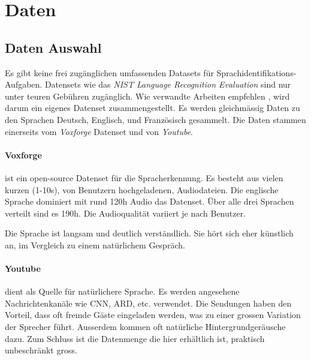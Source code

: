 \section{Daten}


\subsection{Daten Auswahl}
Es gibt keine frei zugänglichen umfassenden Datasets für Sprachidentifikations-Aufgaben. Datensets wie das \textit{NIST Language Recognition Evaluation}\cite{nist} sind nur unter teuren Gebühren zugänglich. Wie verwandte Arbeiten empfehlen \cite{iLID}, wird darum ein eigenes Datenset zusammengestellt. Es werden gleichmässig Daten zu den Sprachen Deutsch, Englisch, und Französisch gesammelt. Die Daten stammen einerseits vom \textit{Voxforge}\cite{voxforge} Datenset und von \textit{Youtube}\cite{youtube}.

\paragraph{Voxforge} ist ein open-source Datenset für die Spracherkennung. Es besteht aus vielen kurzen (1-10s), von Benutzern hochgeladenen, Audiodateien. Die englische Sprache dominiert mit rund 120h Audio das Datenset. Über alle drei Sprachen verteilt sind es 190h. Die Audioqualität variiert je nach Benutzer.

Die Sprache ist langsam und deutlich verständlich. Sie hört sich eher künstlich an, im Vergleich zu einem natürlichem Gespräch.

\paragraph{Youtube}dient als Quelle für natürlichere Sprache. Es werden angesehene Nachrichtenkanäle wie CNN, ARD, etc. verwendet. Die Sendungen haben den Vorteil, dass oft fremde Gäste eingeladen werden, was zu einer grossen Variation der Sprecher führt. Ausserdem kommen oft natürliche Hintergrundgeräusche dazu. Zum Schluss ist die Datenmenge die hier erhältlich ist, praktisch unbeschränkt gross.

